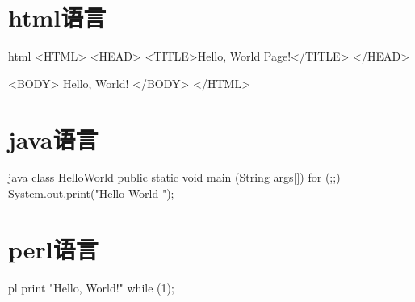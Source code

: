\documentclass[11pt,oneside]{book}
\begin{document}
\begin{common-format}
\chapter{html语言}
\begin{xverbatim}{html}
<HTML>
<HEAD>
<TITLE>Hello, World Page!</TITLE>
</HEAD>

<BODY>
Hello, World!
</BODY>
</HTML>
\end{xverbatim}

\chapter{java语言}
\begin{xverbatim}{java}
class HelloWorld {
        public static void main (String args[]) {
        for (;;) {
                 System.out.print("Hello World ");
                 }
        }
}
\end{xverbatim}

\chapter{perl语言}
\begin{xverbatim}{pl}
print "Hello, World!\n" while (1);
\end{xverbatim}






\end{common-format}
\end{document}
